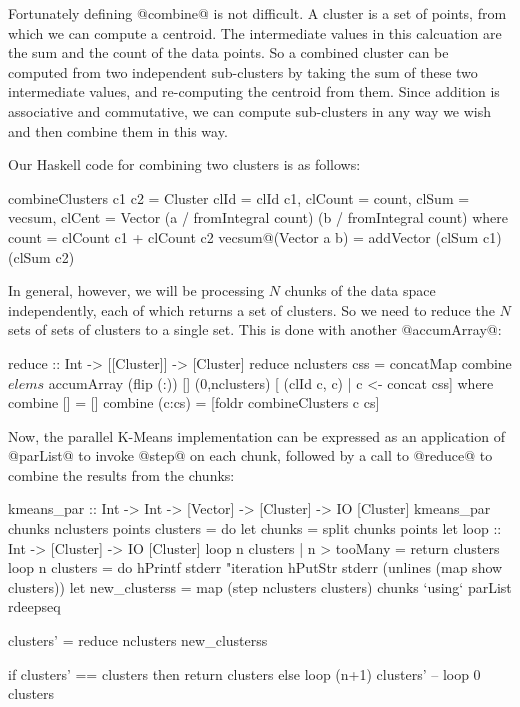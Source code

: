 Fortunately defining @combine@ is not difficult.  A cluster is a set
of points, from which we can compute a centroid.  The intermediate
values in this calcuation are the sum and the count of the data
points.  So a combined cluster can be computed from two independent
sub-clusters by taking the sum of these two intermediate values, and
re-computing the centroid from them.  Since addition is associative
and commutative, we can compute sub-clusters in any way we wish and
then combine them in this way.

Our Haskell code for combining two clusters is as follows:

\begin{haskell}
combineClusters c1 c2 =
  Cluster {clId = clId c1,
           clCount = count,
           clSum = vecsum,
           clCent = Vector (a / fromIntegral count)
                           (b / fromIntegral count)}
  where count = clCount c1 + clCount c2
        vecsum@(Vector a b)  = addVector (clSum c1) (clSum c2)
\end{haskell}

\noindent In general, however, we will be processing $N$ chunks of the
data space independently, each of which returns a set of clusters.  So
we need to reduce the $N$ sets of sets of clusters to a single set.
This is done with another @accumArray@:

\begin{haskell}
reduce :: Int -> [[Cluster]] -> [Cluster]
reduce nclusters css =
  concatMap combine $ elems $
    accumArray (flip (:)) [] (0,nclusters)
       [ (clId c, c) | c <- concat css]
 where
  combine [] = []
  combine (c:cs) = [foldr combineClusters c cs]
\end{haskell}

Now, the parallel K-Means implementation can be expressed as an
application of @parList@ to invoke @step@ on each chunk, followed by a
call to @reduce@ to combine the results from the chunks:

\begin{numhaskell}
kmeans_par :: Int -> Int -> [Vector] -> [Cluster]
           -> IO [Cluster]
kmeans_par chunks nclusters points clusters = do
  let chunks = split chunks points
  let
      loop :: Int -> [Cluster] -> IO [Cluster]
      loop n clusters | n > tooMany = return clusters
      loop n clusters = do
        hPrintf stderr "iteration %
        hPutStr stderr (unlines (map show clusters))
        let
             new_clusterss =
                map (step nclusters clusters) chunks
                   `using` parList rdeepseq

             clusters' = reduce nclusters new_clusterss

        if clusters' == clusters
           then return clusters
           else loop (n+1) clusters'
  --
  loop 0 clusters
\end{numhaskell}

